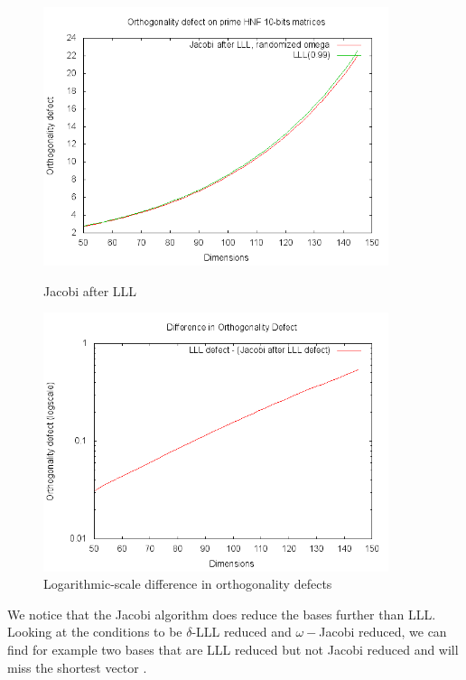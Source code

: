 \documentclass[10pt, a4paper]{article}
\newcommand{\my}[1]{{\color{blue} #1 }}
\begin{document}
\begin{figure}[H]
\begin{minipage}{.45\textwidth}
  \centering
    \includegraphics[width=0.9\textwidth]{results-graphs/LLLThenJacobi/defect.png}
      \caption{Jacobi after LLL}
  \label{fig4}
\end{minipage}
\hspace{.05\textwidth}
\begin{minipage}{.45\textwidth}

  \centering
    \includegraphics[width=0.9\textwidth]{results-graphs/LLLThenJacobi/defect-logscale-difference.png}
    
  \caption{Logarithmic-scale difference in orthogonality defects}
  \label{fig5}
\end{minipage}
\end{figure}

We notice that the Jacobi algorithm does reduce the bases further than LLL. Looking at the conditions to be $\delta$-LLL reduced and $\omega-$Jacobi reduced, we can find for example two bases that are LLL reduced but not Jacobi reduced \my{and will miss the shortest vector}.
\end{document}
